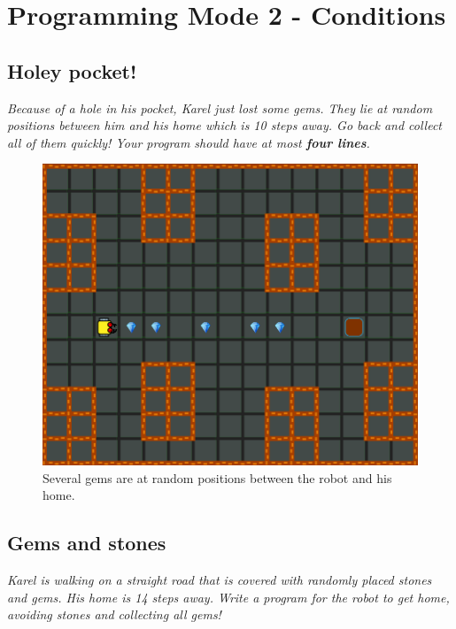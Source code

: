 
\setcounter{section}{6}
\section{Programming Mode 2 - Conditions}

\subsection{Holey pocket!}

{\em Because of a hole in his pocket, Karel just lost some gems. They lie at random positions between him and his home which is 10 steps away. Go back and collect all of them quickly! Your program should have at most {\bf four lines}.}\\[-9mm]

\begin{figure}[!ht]
\begin{center}
\includegraphics[height=0.4\textwidth]{img/d01.png}
\end{center}
\vspace{-5mm}
\caption{Several gems are at random positions between the robot and his home.}
\label{fig:d01}
\vspace{-1.3cm}
\end{figure}


\subsection{Gems and stones}

{\em Karel is walking on a straight road that is covered with 
randomly placed stones and gems. His home is 14 steps away. 
Write a program for the robot to get home, avoiding stones 
and collecting all gems!}\\[-9mm]


